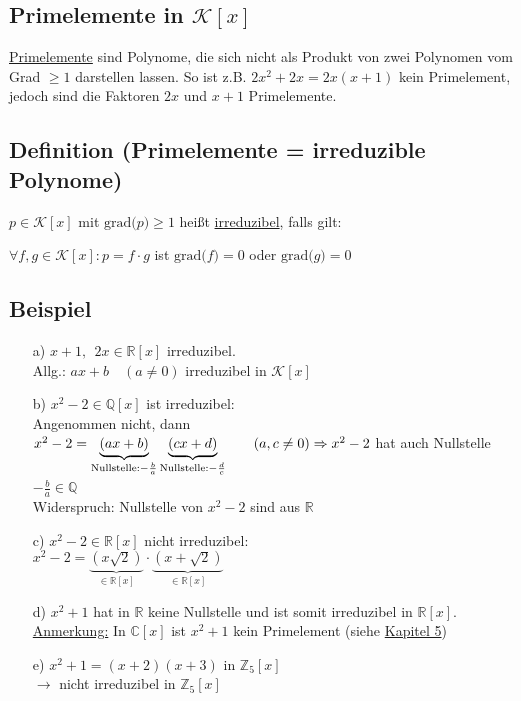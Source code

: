 \documentclass[12pt,titlepage, pdf]{article}
\newcommand{\grad}[1]{\textrm{grad(}#1\textrm{)}}
\newcommand{\R}{\mathds{R}}
\newcommand{\K}{\mathcal{K}}
\newcommand{\uline}[1]{\underline{#1}}
\renewcommand{\>}{\rightarrow}
\renewcommand{\*}{\cdot}
\begin{document}
	\subsection*{Primelemente in $\K[x]$}
	\uline{Primelemente} sind Polynome, die sich nicht als Produkt von zwei Polynomen vom Grad $\geq 1$ darstellen lassen. So ist z.B. $2x^2 + 2x = 2x(x+1)$ kein Primelement, jedoch sind die Faktoren $2x$ und $x+1$ Primelemente.
	\subsection{Definition (Primelemente = irreduzible Polynome)}
	$p \in \K[x]$ mit $\grad{p}\geq 1$ heißt \uline{irreduzibel}, falls gilt: 
	\begin{center}
		$\forall f,g \in \K[x]: p = f \cdot g$ ist $\grad{f} = 0$ oder $\grad{g} = 0$
	\end{center}
	\subsection{Beispiel}
	\begin{itemize}
		\item[a)]
		$x+1,~~ 2x \in \R[x]$ irreduzibel.\\
		Allg.: $ax +b \quad (a\neq 0)$ irreduzibel in $\K[x]$
		\item[b)]
		$x^2 - 2 \in \mathds{Q}[x]$ ist irreduzibel: \\
		Angenommen nicht, dann $x^2 - 2 = \underbrace{(ax + b)}_{\text{Nullstelle:} -\frac{b}{a}} \underbrace{(cx+d)}_{\text{Nullstelle:} -\frac{d}{c}}\qquad(a,c\neq0) \\
		\Rightarrow x^2 -2$ hat auch Nullstelle $-\frac{b}{a} \in \mathds{Q}$~\Lightning\\
		Widerspruch: Nullstelle von $x^2 -2$ sind aus $\R$
		\item[c)] $x^2 -2 \in \R[x]$ nicht irreduzibel: \\
		$x^2 - 2 = \underbrace{(x\sqrt{2})}_{\in \R[x]} \cdot \underbrace{(x+\sqrt{2})}_{\in \R[x]}$
		\item[d)] $x^2+1$ hat in $\R$ keine Nullstelle und ist somit irreduzibel in $\R[x]$. \\
		\uline{Anmerkung:} In $\mathds{C}[x]$ ist $x^2 +1$ kein Primelement (siehe \hyperref[5]{Kapitel 5})
		\item[e)]
		$x^2 +1 = (x+2)(x+3)$ in $\mathds{Z}_5[x]$\\
		$\rightarrow$ nicht irreduzibel in $\mathds{Z}_5[x]$ 
	\end{itemize}
\end{document}
